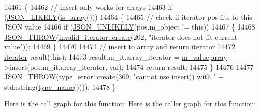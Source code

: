 \begin{DoxyCode}
14461     \{
14462         \textcolor{comment}{// insert only works for arrays}
14463         \textcolor{keywordflow}{if} (\hyperlink{json_8hpp_a41ecd1c4cf7c3d56477b9b685b5daa72}{JSON\_LIKELY}(\hyperlink{classnlohmann_1_1basic__json_aef9ce5dd2381caee1f8ddcdb5bdd9c65}{is\_array}()))
14464         \{
14465             \textcolor{comment}{// check if iterator pos fits to this JSON value}
14466             \textcolor{keywordflow}{if} (\hyperlink{json_8hpp_ab77582407c64944e7db1ea95ab520253}{JSON\_UNLIKELY}(pos.m\_object != \textcolor{keyword}{this}))
14467             \{
14468                 \hyperlink{json_8hpp_a6c274f6db2e65c1b66c7d41b06ad690f}{JSON\_THROW}(\hyperlink{classnlohmann_1_1detail_1_1invalid__iterator_a4e849260a3caa1b288c7e619130c6c09}{invalid\_iterator::create}(202, \textcolor{stringliteral}{"iterator does
       not fit current value"}));
14469             \}
14470 
14471             \textcolor{comment}{// insert to array and return iterator}
14472             \hyperlink{classnlohmann_1_1basic__json_a099316232c76c034030a38faa6e34dca}{iterator} result(\textcolor{keyword}{this});
14473             result.m\_it.array\_iterator = \hyperlink{classnlohmann_1_1basic__json_aeb0814f76966f99290cb29e127c90a77}{m\_value}.\hyperlink{unionnlohmann_1_1basic__json_1_1json__value_a7947687f3ae1911d6e9847e2b3226157}{array}->insert(pos.m\_it.array\_iterator, val);
14474             \textcolor{keywordflow}{return} result;
14475         \}
14476 
14477         \hyperlink{json_8hpp_a6c274f6db2e65c1b66c7d41b06ad690f}{JSON\_THROW}(\hyperlink{classnlohmann_1_1detail_1_1type__error_aecc083aea4b698c33d042670ba50c10f}{type\_error::create}(309, \textcolor{stringliteral}{"cannot use insert() with "} + 
      std::string(\hyperlink{classnlohmann_1_1basic__json_a9d0a478571f82f0163b96b2424cd998f}{type\_name}())));
14478     \}
\end{DoxyCode}
Here is the call graph for this function\+:
Here is the caller graph for this function\+:
\mbox{\label{classnlohmann_1_1basic__json_a1ecce113ff11dd294689ee4d45cbb855}} 
